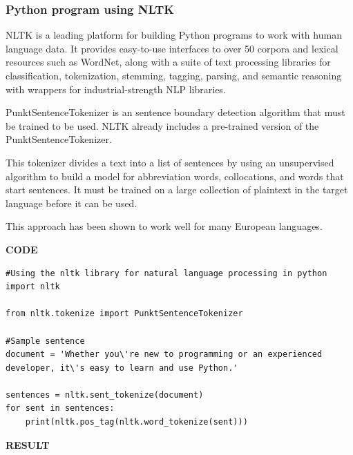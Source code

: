 \documentclass[14pt,a4paper]{article}
\begin{document}
\subsubsection{Python program using NLTK}
\par NLTK is a leading platform for building Python programs to work with human language data. It provides easy-to-use interfaces to over 50 corpora and lexical resources such as WordNet, along with a suite of text processing libraries for classification, tokenization, stemming, tagging, parsing, and semantic reasoning with wrappers for industrial-strength NLP libraries.
\par PunktSentenceTokenizer is an sentence boundary detection algorithm that must be trained to be used. NLTK already includes a pre-trained version of the PunktSentenceTokenizer. 
\par This tokenizer divides a text into a list of sentences by using an unsupervised algorithm to build a model for abbreviation words, collocations, and words that start sentences.  It must be trained on a large collection of plaintext in the target language before it can be used.
\par This approach has been shown to work well for many European languages.
\par 
\textbf{CODE}
\begin{lstlisting}
#Using the nltk library for natural language processing in python
import nltk

from nltk.tokenize import PunktSentenceTokenizer
 
#Sample sentence
document = 'Whether you\'re new to programming or an experienced developer, it\'s easy to learn and use Python.'

sentences = nltk.sent_tokenize(document)   
for sent in sentences:
    print(nltk.pos_tag(nltk.word_tokenize(sent)))
\end{lstlisting}
\par \textbf{RESULT}
\end{document}
